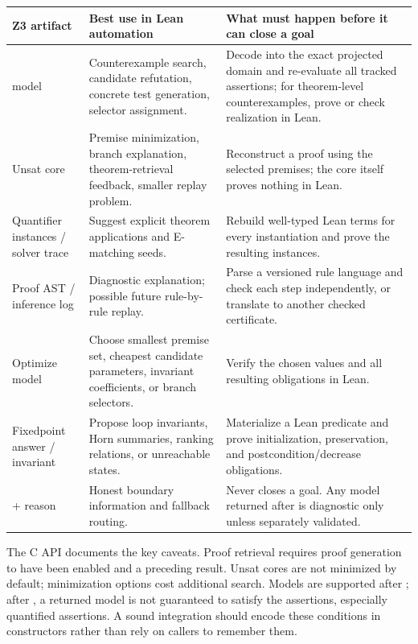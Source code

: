 \documentclass[11pt,letterpaper,openany]{report}
\newcommand{\code}[1]{\texttt{\detokenize{#1}}}
\begin{document}
\begin{longtable}{@{}L{0.18\textwidth}L{0.32\textwidth}L{0.39\textwidth}@{}}
\toprule
\textbf{Z3 artifact} & \textbf{Best use in Lean automation} & \textbf{What must happen before it can close a goal} \\
\midrule
\endhead
\code{sat} model & Counterexample search, candidate refutation, concrete test generation, selector assignment. & Decode into the exact projected domain and re-evaluate all tracked assertions; for theorem-level counterexamples, prove or check realization in Lean. \\
Unsat core & Premise minimization, branch explanation, theorem-retrieval feedback, smaller replay problem. & Reconstruct a proof using the selected premises; the core itself proves nothing in Lean. \\
Quantifier instances / solver trace & Suggest explicit theorem applications and E-matching seeds. & Rebuild well-typed Lean terms for every instantiation and prove the resulting instances. \\
Proof AST / inference log & Diagnostic explanation; possible future rule-by-rule replay. & Parse a versioned rule language and check each step independently, or translate to another checked certificate. \\
Optimize model & Choose smallest premise set, cheapest candidate parameters, invariant coefficients, or branch selectors. & Verify the chosen values and all resulting obligations in Lean. \\
Fixedpoint answer / invariant & Propose loop invariants, Horn summaries, ranking relations, or unreachable states. & Materialize a Lean predicate and prove initialization, preservation, and postcondition/decrease obligations. \\
\code{unknown} + reason & Honest boundary information and fallback routing. & Never closes a goal. Any model returned after \code{unknown} is diagnostic only unless separately validated. \\
\bottomrule
\end{longtable}

The C API documents the key caveats. Proof retrieval requires proof generation to
have been enabled and a preceding \code{unsat} result. Unsat cores are not minimized
by default; minimization options cost additional search. Models are supported after
\code{sat}; after \code{unknown}, a returned model is not guaranteed to satisfy the
assertions, especially quantified assertions. A sound integration should encode these
conditions in constructors rather than rely on callers to remember them.
\end{document}
